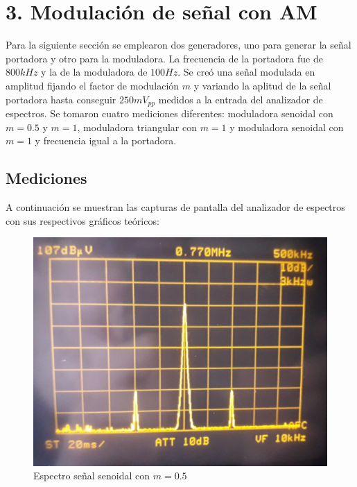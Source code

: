 \section{3. Modulaci\'on de se\~nal con AM}
Para la siguiente secci\'on se emplearon dos generadores, uno para generar la señal portadora y otro para la moduladora. La frecuencia de la portadora fue de $800kHz$ y la de la moduladora de $100Hz$. Se cre\'o una señal modulada en amplitud fijando el factor de modulaci\'on $m$ y variando la aplitud de la señal portadora hasta conseguir $250mV_{pp}$ medidos a la entrada del analizador de espectros. Se tomaron cuatro mediciones diferentes: moduladora senoidal con $m = 0.5$ y $m = 1$, moduladora triangular con $m = 1$ y moduladora senoidal con $m = 1$ y frecuencia igual a la portadora.

\subsection{Mediciones}

A continuaci\'on se muestran las capturas de pantalla del analizador de espectros con sus respectivos gráficos teóricos:

\begin{figure}[H]
    \centering
    \includegraphics[scale=0.3]{Recursos/Ej3_senoidal_m05.jpeg}
    \caption{Espectro señal senoidal con $m = 0.5$}
\end{figure}

